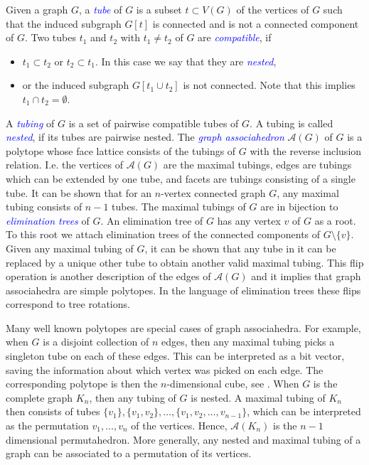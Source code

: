 \documentclass[fontsize=11pt,a4paper,DIV=12]{scrartcl}
\newcommand{\defn}[1]{\textsl{\textcolor{Blue}{#1}}}
\begin{document}
Given a graph $G$, a \defn{tube} of $G$ is a subset $t\subset V(G)$ of the vertices of $G$ such that the induced subgraph $G[t]$ is connected and is not a connected component of $G$. Two tubes $t_1$ and $t_2$ with $t_1\ne t_2$ of $G$ are \defn{compatible}, if
\begin{itemize}
    \item $t_1\subset t_2$ or $t_2\subset t_1$. In this case we say that they are \defn{nested},
    \item or the induced subgraph $G[t_1\cup t_2]$ is not connected. Note that this implies $t_1\cap t_2=\emptyset$.
\end{itemize}
A \defn{tubing} of $G$ is a set of pairwise compatible tubes of $G$. A tubing is called \defn{nested}, if its tubes are pairwise nested. The \defn{graph associahedron} $\mathcal A(G)$ of $G$ is a polytope whose face lattice consists of the tubings of $G$ with the reverse inclusion relation. I.e. the vertices of $\mathcal A(G)$ are the maximal tubings, edges are tubings which can be extended by one tube, and facets are tubings consisting of a single tube. It can be shown that for an $n$-vertex connected graph $G$, any maximal tubing consists of $n-1$ tubes. The maximal tubings of $G$ are in bijection to \defn{elimination trees} of $G$. An elimination tree of $G$ has any vertex $v$ of $G$ as a root. To this root we attach elimination trees of the connected components of $G\setminus\{v\}$. Given any maximal tubing of $G$, it can be shown that any tube in it can be replaced by a unique other tube to obtain another valid maximal tubing. This flip operation is another description of the edges of $\mathcal A(G)$ and it implies that graph associahedra are simple polytopes. In the language of elimination trees these flips correspond to tree rotations. 

Many well known polytopes are special cases of graph associahedra. For example, when $G$ is a disjoint collection of $n$ edges, then any maximal tubing picks a singleton tube on each of these edges. This can be interpreted as a bit vector, saving the information about which vertex was picked on each edge. The corresponding polytope is then the $n$-dimensional cube, see . When $G$ is the complete graph $K_n$, then any tubing of $G$ is nested. A maximal tubing of $K_n$ then consists of tubes $\{v_1\},\{v_1,v_2\},\ldots,\{v_1,v_2,\ldots,v_{n-1}\}$, which can be interpreted as the permutation $v_1,\ldots,v_n$ of the vertices. Hence, $\mathcal A(K_n)$ is the $n-1$ dimensional permutahedron. More generally, any nested and maximal tubing of a graph can be associated to a permutation of its vertices.
\end{document}
